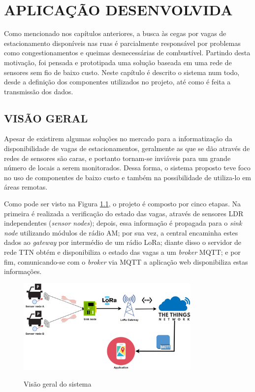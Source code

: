 \documentclass[oneside,openright,12pt]{ufsm_2015} %
\begin{document}
\chapter{APLICAÇÃO DESENVOLVIDA}
Como mencionado nos capítulos anteriores, a busca às cegas por vagas de estacionamento disponíveis nas ruas é parcialmente responsável por problemas como congestionamentos e queimas desnecessárias de combustível. Partindo desta motivação, foi pensada e prototipada uma solução baseada em uma rede de sensores sem fio de baixo custo. 
Neste capítulo é descrito o sistema num todo, desde a definição dos componentes utilizados no projeto, até como é feita a transmissão dos dados.
    
    \section{VISÃO GERAL}
    Apesar de existirem algumas soluções no mercado para a informatização da disponibilidade de vagas de estacionamentos, geralmente as que se dão através de redes de sensores são caras, e portanto tornam-se inviáveis para um grande número de locais a serem monitorados. Dessa forma, o sistema proposto teve foco no uso de componentes de baixo custo e também na possibilidade de utiliza-lo em áreas remotas.
    
    Como pode ser visto na Figura \ref{fig:visao-geral}, o projeto é composto por cinco etapas. Na primeira é realizada a verificação do estado das vagas, através de sensores LDR independentes (\textit{sensor nodes}); depois, essa informação é propagada para o \textit{sink node} utilizando módulos de rádio AM; por sua vez, a central encaminha estes dados ao \textit{gateway} por intermédio de um rádio LoRa; diante disso o servidor de rede TTN obtém e disponibiliza o estado das vagas a um \textit{broker} MQTT; e por fim, comunicando-se com o \textit{broker} via MQTT a aplicação web disponibiliza estas informações.
    
    \begin{figure}[ht]
     	   \caption{\label{exepretex} Visão geral do sistema}
            \centering
            \includegraphics[width=0.8\textwidth]{figuras/funcionamento.png}
            \vspace{\baselineskip} %
                \label{fig:visao-geral}
    \end{figure}
    
\end{document}
